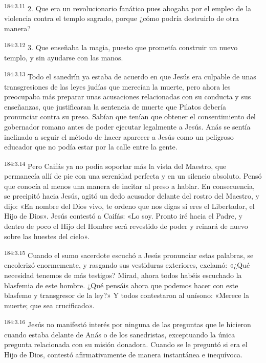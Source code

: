 \par 
\textsuperscript{184:3.11} 2. Que era un revolucionario fanático pues abogaba por el empleo de la violencia contra el templo sagrado, porque ¿cómo podría destruirlo de otra manera?

\par 
\textsuperscript{184:3.12} 3. Que enseñaba la magia, puesto que prometía construir un nuevo templo, y sin ayudarse con las manos.

\par 
\textsuperscript{184:3.13} Todo el sanedrín ya estaba de acuerdo en que Jesús era culpable de unas transgresiones de las leyes judías que merecían la muerte, pero ahora les preocupaba más preparar unas acusaciones relacionadas con su conducta y sus enseñanzas, que justificaran la sentencia de muerte que Pilatos debería pronunciar contra su preso. Sabían que tenían que obtener el consentimiento del gobernador romano antes de poder ejecutar legalmente a Jesús. Anás se sentía inclinado a seguir el método de hacer aparecer a Jesús como un peligroso educador que no podía estar por la calle entre la gente.

\par 
\textsuperscript{184:3.14} Pero Caifás ya no podía soportar más la vista del Maestro, que permanecía allí de pie con una serenidad perfecta y en un silencio absoluto. Pensó que conocía al menos una manera de incitar al preso a hablar. En consecuencia, se precipitó hacia Jesús, agitó un dedo acusador delante del rostro del Maestro, y dijo: «En nombre del Dios vivo, te ordeno que nos digas si eres el Libertador, el Hijo de Dios». Jesús contestó a Caifás: «Lo soy. Pronto iré hacia el Padre, y dentro de poco el Hijo del Hombre será revestido de poder y reinará de nuevo sobre las huestes del cielo».

\par 
\textsuperscript{184:3.15} Cuando el sumo sacerdote escuchó a Jesús pronunciar estas palabras, se encolerizó enormemente, y rasgando sus vestiduras exteriores, exclamó: «¿Qué necesidad tenemos de más testigos? Mirad, ahora todos habéis escuchado la blasfemia de este hombre. ¿Qué pensáis ahora que podemos hacer con este blasfemo y transgresor de la ley?» Y todos contestaron al unísono: «Merece la muerte; que sea crucificado».

\par 
\textsuperscript{184:3.16} Jesús no manifestó interés por ninguna de las preguntas que le hicieron cuando estaba delante de Anás o de los sanedristas, exceptuando la única pregunta relacionada con su misión donadora. Cuando se le preguntó si era el Hijo de Dios, contestó afirmativamente de manera instantánea e inequívoca.

